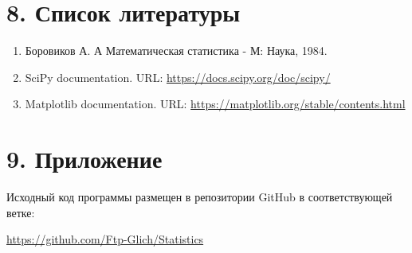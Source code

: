 \documentclass[a4paper,14pt]{extarticle}
\begin{document}
\section*{8. Список литературы}

\begin{enumerate}
    \item Боровиков А. А Математическая статистика - М: Наука, 1984.
           
    \item SciPy documentation. URL: \url{https://docs.scipy.org/doc/scipy/}
    
    \item Matplotlib documentation. URL: \url{https://matplotlib.org/stable/contents.html}
\end{enumerate}

\section*{9. Приложение}

Исходный код программы размещен в репозитории GitHub в соответствующей ветке:

\url{https://github.com/Ftp-Glich/Statistics}
\end{document}
